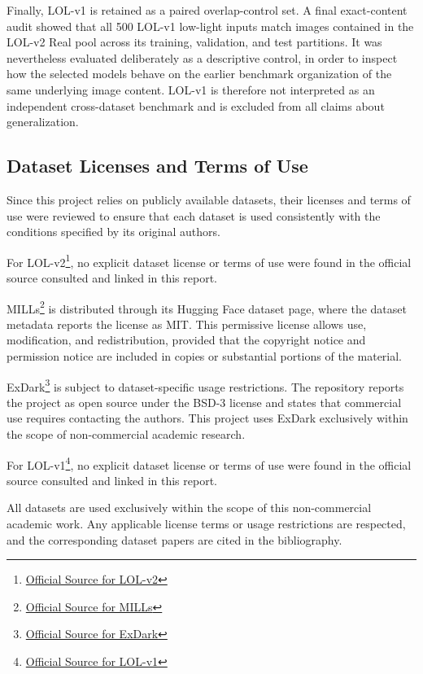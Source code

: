 Finally, LOL-v1 is retained as a paired overlap-control set. A final exact-content audit showed that all 500 LOL-v1 low-light inputs match images contained in the LOL-v2 Real pool across its training, validation, and test partitions. It was nevertheless evaluated deliberately as a descriptive control, in order to inspect how the selected models behave on the earlier benchmark organization of the same underlying image content. LOL-v1 is therefore not interpreted as an independent cross-dataset benchmark and is excluded from all claims about generalization.

\subsection{Dataset Licenses and Terms of Use}

Since this project relies on publicly available datasets, their licenses and terms of use were reviewed to ensure that each dataset is used consistently with the conditions specified by its original authors.

For LOL-v2\footnote{\href{https://github.com/flyywh/CVPR-2020-Semi-Low-Light}{Official Source for LOL-v2}}, no explicit dataset license or terms of use were found in the official source consulted and linked in this report.

MILLs\footnote{\href{https://huggingface.co/datasets/davidserra9/MILL}{Official Source for MILLs}} is distributed through its Hugging Face dataset page, where the dataset metadata reports the license as MIT. This permissive license allows use, modification, and redistribution, provided that the copyright notice and permission notice are included in copies or substantial portions of the material.

ExDark\footnote{\href{https://github.com/cs-chan/Exclusively-Dark-Image-Dataset}{Official Source for ExDark}} is subject to dataset-specific usage restrictions. The repository reports the project as open source under the BSD-3 license and states that commercial use requires contacting the authors. This project uses ExDark exclusively within the scope of non-commercial academic research.

For LOL-v1\footnote{\href{https://daooshee.github.io/BMVC2018website/}{Official Source for LOL-v1}}, no explicit dataset license or terms of use were found in the official source consulted and linked in this report.

All datasets are used exclusively within the scope of this non-commercial academic work. Any applicable license terms or usage restrictions are respected, and the corresponding dataset papers are cited in the bibliography.

